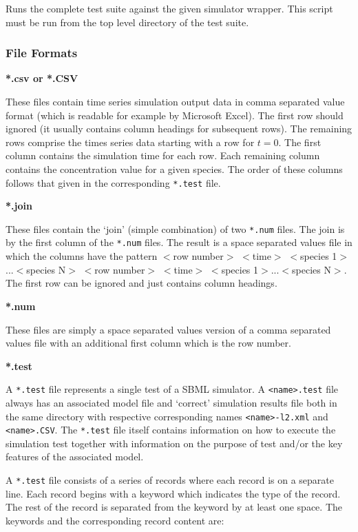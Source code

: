 \documentclass{cekarticle}
\begin{document}
Runs the complete test suite against the given simulator wrapper.
This script must be run from the top level directory of the test
suite.

\subsubsection{File Formats}
\label{sec:formats}

\textbf{*.csv or *.CSV}

These files contain time series simulation output data in comma
separated value format (which is readable for example by Microsoft
Excel).  The first row should ignored (it usually contains column
headings for subsequent rows).  The remaining rows comprise the
times series data starting with a row for $t=0$.  The first column
contains the simulation time for each row.  Each remaining column
contains the concentration value for a given species.  The order
of these columns follows that given in the corresponding
\texttt{*.test} file.

\textbf{*.join}

These files contain the `join' (simple combination) of two
\texttt{*.num} files. The join is by the first column of the
\texttt{*.num} files.  The result is a space separated values file
in which the columns have the pattern $<$row number$>$ $<$time$>$
$<$species 1$>$...$<$species N$>$ $<$row number$>$ $<$time$>$
$<$species 1$>$...$<$species N$>$. The first row can be ignored
and just contains column headings.

\textbf{*.num}

These files are simply a space separated values version of a comma
separated values file with an additional first column which is the
row number.

\textbf{*.test}

A \texttt{*.test} file represents a single test of a SBML
simulator. A \texttt{<name>.test} file always has an associated
model file and `correct' simulation results file both in the same
directory with respective corresponding names
\texttt{<name>-l2.xml} and \texttt{<name>.CSV}.  The
\texttt{*.test} file itself contains information on how to execute
the simulation test together with information on the purpose of
test and/or the key features of the associated model.

A \texttt{*.test} file consists of a series of records where each
record is on a separate line.  Each record begins with a keyword
which indicates the type of the record.  The rest of the record is
separated from the keyword by at least one space.  The keywords
and the corresponding record content are:
\end{document}
